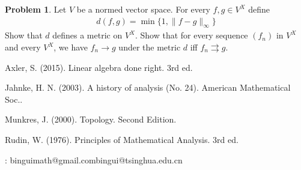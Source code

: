 \documentclass[12pt,b5paper,notitlepage]{article}
\theoremstyle{definition}
\newtheorem{prob}{Problem}[section]
\theoremstyle{plain}
\numberwithin{equation}{section}
\begin{document}
\begin{prob}\label{lb81}
Let $V$ be a normed vector space. For every $f,g\in V^X$ define
\begin{align}
d(f,g)=\min\{1,\lVert f-g\lVert_\infty \}
\end{align}
Show that $d$ defines a metric on $V^X$. Show that for every sequence $(f_n)$ in $V^X$ and every $V^X$, we have $f_n\rightarrow g$ under the metric $d$ iff $f_n\rightrightarrows g$.
\end{prob}














\newpage

\printindex	






	\begin{thebibliography}{999999}
		\footnotesize	

Axler, S. (2015). Linear algebra done right. 3rd ed.

Jahnke, H. N. (2003). A history of analysis (No. 24). American Mathematical Soc..

Munkres, J. (2000). Topology. Second Edition.



Rudin, W. (1976). Principles of Mathematical Analysis. 3rd ed.


		
\end{thebibliography}


: binguimath@gmail.com\qquad bingui@tsinghua.edu.cn
\end{document}
